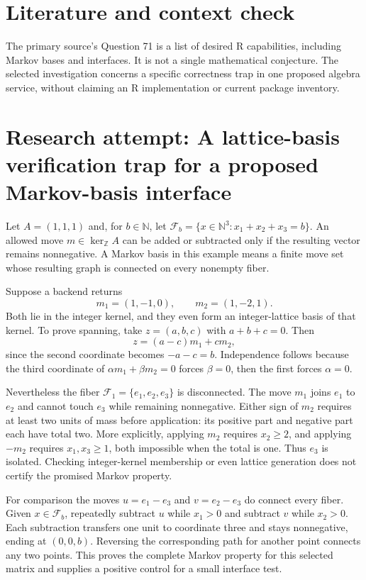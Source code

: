 \documentclass[11pt]{article}
\begin{document}
\section{Literature and context check}
The primary source's Question 71 is a list of desired R capabilities, including Markov bases and interfaces. It is not a single mathematical conjecture. The selected investigation concerns a specific correctness trap in one proposed algebra service, without claiming an R implementation or current package inventory.
\section{Research attempt: A lattice-basis verification trap for a proposed Markov-basis interface}
Let $A=(1,1,1)$ and, for $b\in\mathbb N$, let $\mathcal F_b=\{x\in\mathbb N^3:x_1+x_2+x_3=b\}$. An allowed move $m\in\ker_{\mathbb Z}A$ can be added or subtracted only if the resulting vector remains nonnegative. A Markov basis in this example means a finite move set whose resulting graph is connected on every nonempty fiber.

Suppose a backend returns
\[
m_1=(1,-1,0),\qquad m_2=(1,-2,1).
\]
Both lie in the integer kernel, and they even form an integer-lattice basis of that kernel. To prove spanning, take $z=(a,b,c)$ with $a+b+c=0$. Then
\[
z=(a-c)m_1+c m_2,
\]
since the second coordinate becomes $-a-c=b$. Independence follows because the third coordinate of $\alpha m_1+\beta m_2=0$ forces $\beta=0$, then the first forces $\alpha=0$.

Nevertheless the fiber $\mathcal F_1=\{e_1,e_2,e_3\}$ is disconnected. The move $m_1$ joins $e_1$ to $e_2$ and cannot touch $e_3$ while remaining nonnegative. Either sign of $m_2$ requires at least two units of mass before application: its positive part and negative part each have total two. More explicitly, applying $m_2$ requires $x_2\ge2$, and applying $-m_2$ requires $x_1,x_3\ge1$, both impossible when the total is one. Thus $e_3$ is isolated. Checking integer-kernel membership or even lattice generation does not certify the promised Markov property.

For comparison the moves $u=e_1-e_3$ and $v=e_2-e_3$ do connect every fiber. Given $x\in\mathcal F_b$, repeatedly subtract $u$ while $x_1>0$ and subtract $v$ while $x_2>0$. Each subtraction transfers one unit to coordinate three and stays nonnegative, ending at $(0,0,b)$. Reversing the corresponding path for another point connects any two points. This proves the complete Markov property for this selected matrix and supplies a positive control for a small interface test.
\end{document}
